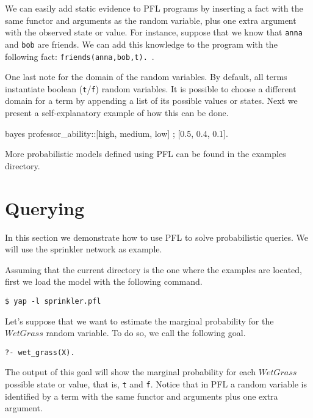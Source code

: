 \documentclass{article}
\begin{document}
We can easily add static evidence to PFL programs by inserting a fact with the same functor and arguments as the random variable, plus one extra argument with the observed state or value. For instance, suppose that we know that \texttt{anna} and \texttt{bob} are friends. We can add this knowledge to the program with the following fact: \texttt{friends(anna,bob,t).}~.

One last note for the domain of the random variables. By default, all terms instantiate boolean (\texttt{t}/\texttt{f}) random variables. It is possible to choose a different domain for a term by appending a list of its possible values or states. Next we present a self-explanatory example of how this can be done.

\begin{pflcode}
bayes professor_ability::[high, medium, low] ; [0.5, 0.4, 0.1].
\end{pflcode}

More probabilistic models defined using PFL can be found in the examples directory.



\section{Querying}
In this section we demonstrate how to use PFL to solve probabilistic queries. We will use the sprinkler network as example.

Assuming that the current directory is the one where the examples are located, first we load the model with the following command.

\texttt{\$ yap -l sprinkler.pfl}

Let's suppose that we want to estimate the marginal probability for the $WetGrass$ random variable. To do so, we call the following goal.

\texttt{?- wet\_grass(X).}

The output of this goal will show the marginal probability for each $WetGrass$ possible state or value, that is, \texttt{t} and \texttt{f}. Notice that in PFL a random variable is identified by a term with the same functor and arguments plus one extra argument.
\end{document}
